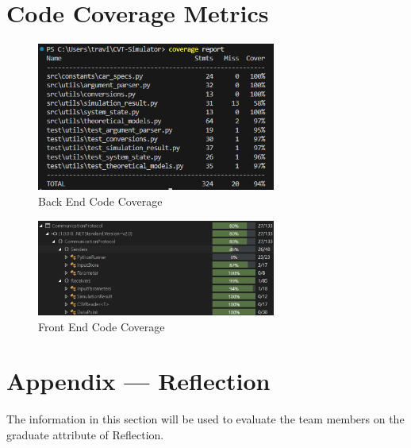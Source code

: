 \documentclass[12pt, titlepage]{article}
\begin{document}
\section{Code Coverage Metrics}

\begin{figure}[H]
  \begin{center}
   \includegraphics[width=0.7\textwidth]{UnitTestCoverageReport.png}
  \caption{Back End Code Coverage}
  \label{Fig_Home} 
  \end{center}
\end{figure}

\begin{figure}[H]
  \begin{center}
   \includegraphics[width=0.7\textwidth]{CSUnitTestCoverage.png}
  \caption{Front End Code Coverage}
  \label{Fig_Home} 
  \end{center}
\end{figure}





\newpage{}
\section*{Appendix --- Reflection}

The information in this section will be used to evaluate the team members on the
graduate attribute of Reflection.


\end{document}
